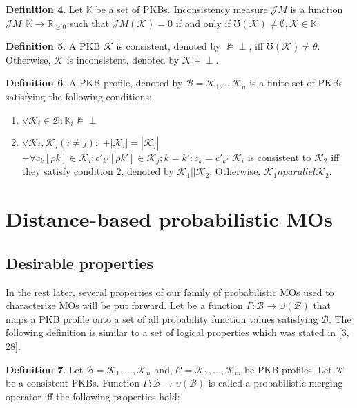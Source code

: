 \documentclass[10pt,a4paper]{IOS-Book-Article}
\begin{document}
\textbf{Definition 4}. Let $\mathbb{K}$ be a set of PKBs. Inconsistency measure $\mathcal{J}M$ is a function $\mathcal{J}M: \mathbb{K} \to \mathbb {R}_{\geq 0}$ such that $\mathcal{J}M(\mathcal{K}) = 0$ if and only if $\mho (\mathcal{K}) \neq \emptyset, \mathcal{K} \in \mathbb{K}$.

\textbf{Definition 5}. A PKB $\mathcal{K}$ is consistent, denoted by $\nvDash \perp$, iff $\mho (\mathcal{K}) \neq \theta$. Otherwise, $\mathcal{K}$ is inconsistent, denoted by $\mathcal{K} \models \perp$.

\textbf{Definition 6}. A PKB profile, denoted by $\mathcal{B} = {\mathcal{K}_1, ...\mathcal{K}_n}$ is a finite set of PKBs satisfying the following conditions: 

\begin{enumerate}

\item $\forall \mathcal{K}_i \in \mathcal{B} : \mathbb{K}_i \nvDash \perp$
\item $\forall \mathcal{K}_i,\mathcal{K}_j (i \neq j) :$
	$+|\mathcal{K}_i| = |\mathcal{K}_j|$ 
	$+\forall c_k[\rho k] \in \mathcal{K}_i; c'_{k'} [\rho k'] \in \mathcal{K}_j; k = k' : c_k = c'_{k'}$
$\mathcal{K}_i$ is consistent to $\mathcal{K}_2$ iff they satisfy condition 2, denoted by $\mathcal{K}_1||\mathcal{K}_2$. Otherwise, $\mathcal{K}_1 nparallel \mathcal{K}_2$.

\end{enumerate}

\section{Distance-based probabilistic MOs}

\subsection{Desirable properties}

In the rest later, several properties of our family of probabilistic MOs used to characterize MOs will be put forward. Let be a function $\Gamma: \mathcal{B} \to \cup(\mathcal{B})$ that maps a PKB profile onto a set of all probability function values satisfying $\mathcal{B}$. The following definition is similar to a set of logical properties which was stated in [3, 28].

\textbf{Definition 7}. Let $\mathcal{B} = {\mathcal{K}_1 , ... ,\mathcal{K}_n}$ and, $\mathcal{C} = {\mathcal{K}_1, ... ,\mathcal{K}_m}$ be PKB profiles. Let $\mathcal{K}$ be a consistent PKBs. Function $\Gamma: \mathcal{B} \to \upsilon(\mathcal{B})$ is called a probabilistic merging operator iff the following properties hold:
\end{document}
